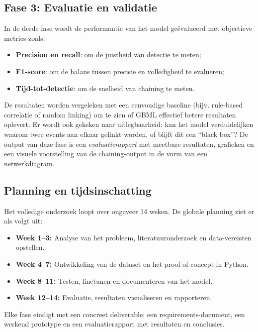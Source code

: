 \subsection{Fase 3: Evaluatie en validatie}
In de derde fase wordt de performantie van het model geëvalueerd met objectieve metrics zoals:
\begin{itemize}
    \item \textbf{Precision en recall}: om de juistheid van detectie te meten;
    \item \textbf{F1-score}: om de balans tussen precisie en volledigheid te evalueren;
    \item \textbf{Tijd-tot-detectie}: om de snelheid van chaining te meten.
\end{itemize}
De resultaten worden vergeleken met een eenvoudige baseline (bijv. rule-based correlatie of random linking) om te zien of GBML effectief betere resultaten oplevert.  
Er wordt ook gekeken naar uitlegbaarheid: kan het model verduidelijken waarom twee events aan elkaar gelinkt worden, of blijft dit een “black box”?  
\newline
\newline
De output van deze fase is een \emph{evaluatierapport} met meetbare resultaten, grafieken en een visuele voorstelling van de chaining-output in de vorm van een netwerkdiagram.

\subsection{Planning en tijdsinschatting}
Het volledige onderzoek loopt over ongeveer 14 weken.  
De globale planning ziet er als volgt uit:
\begin{itemize}
    \item \textbf{Week 1–3:} Analyse van het probleem, literatuuronderzoek en data-vereisten opstellen.
    \item \textbf{Week 4–7:} Ontwikkeling van de dataset en het proof-of-concept in Python.
    \item \textbf{Week 8–11:} Testen, finetunen en documenteren van het model.
    \item \textbf{Week 12–14:} Evaluatie, resultaten visualiseren en rapporteren.
\end{itemize}
Elke fase eindigt met een concreet deliverable: een requirements-document, een werkend prototype en een evaluatierapport met resultaten en conclusies.

